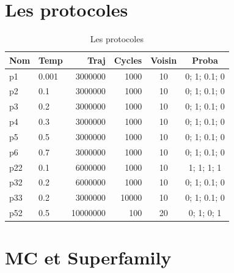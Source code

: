 \documentclass[a4paper,12pt]{article}
\begin{document}
   \section{Les protocoles} 
    
    \begin{table}[!htbp]
      \centering

      \begin{tabular}{|l|l|r|r|c|c|}

        \hline
        Nom & Temp & Traj & Cycles  & Voisin & Proba \\
        \hline
        p1   & 0.001 &  3000000  &  1000  & 10 & 0; 1; 0.1; 0   \\      
        p2   & 0.1   &  3000000  &  1000  & 10 & 0; 1; 0.1; 0   \\  
        p3   & 0.2   &  3000000  &  1000  & 10 & 0; 1; 0.1; 0   \\ 
        p4   & 0.3   &  3000000  &  1000  & 10 & 0; 1; 0.1; 0   \\               
        p5   & 0.5   &  3000000  &  1000  & 10 & 0; 1; 0.1; 0   \\  
        p6   & 0.7   &  3000000  &  1000  & 10 & 0; 1; 0.1; 0   \\  
        p22  & 0.1   &  6000000  &  1000  & 10 & 1; 1;   1; 1   \\  
        p32  & 0.2   &  6000000  &  1000  & 10 & 0; 1; 0.1; 0   \\      
        p33  & 0.2   &  3000000  & 10000  & 10 & 0; 1; 0.1; 0   \\   
        p52  & 0.5   & 10000000  &   100  & 20 & 0; 1;   0; 1   \\  \hline   

        
      \end{tabular}      
      \caption{Les protocoles}
      \label{tab_proto}      
    \end{table}

    \section{MC et Superfamily}
\end{document}
